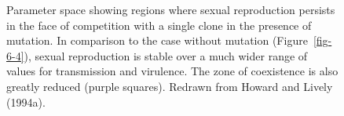 \documentclass[
  letterpaper,
]{book}
\begin{document}
\begin{figure}


\caption[Parameter space showing regions where sexual reproduction
persists in the face of competition with a single clone in the presence
of mutation]{\label{fig-6-5}Parameter space showing regions where sexual
reproduction persists in the face of competition with a single clone in
the presence of mutation. In comparison to the case without mutation
(Figure~\ref{fig-6-4}), sexual reproduction is stable over a much wider
range of values for transmission and virulence. The zone of coexistence
is also greatly reduced (purple squares). Redrawn from Howard and Lively
(1994a).}

\end{figure}%
\end{document}
